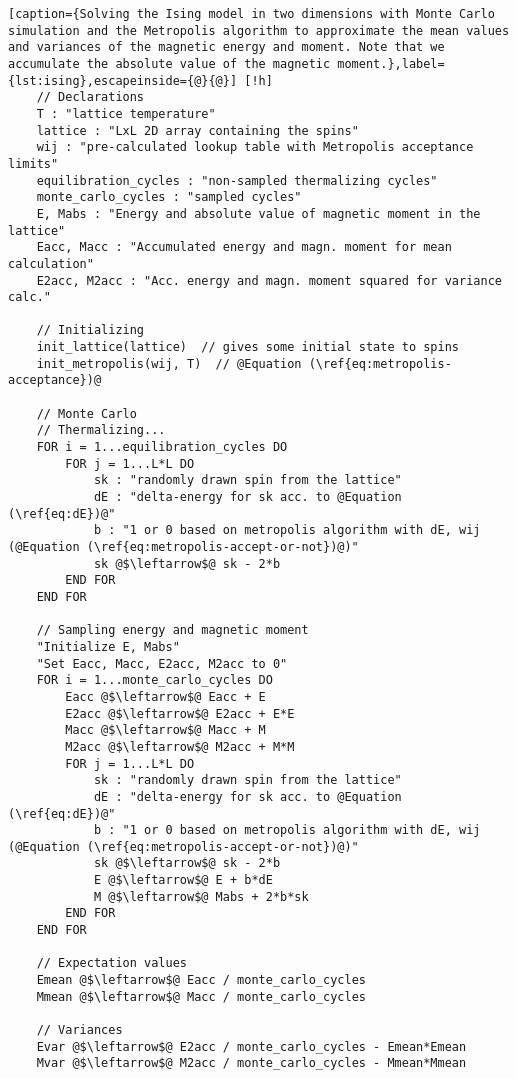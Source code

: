 \documentclass[]{article}
\begin{document}
\begin{lstlisting}[caption={Solving the Ising model in two dimensions with Monte Carlo simulation and the Metropolis algorithm to approximate the mean values and variances of the magnetic energy and moment. Note that we accumulate the absolute value of the magnetic moment.},label={lst:ising},escapeinside={@}{@}] [!h]
	// Declarations
	T : "lattice temperature"
	lattice : "LxL 2D array containing the spins"
	wij : "pre-calculated lookup table with Metropolis acceptance limits"
	equilibration_cycles : "non-sampled thermalizing cycles"
	monte_carlo_cycles : "sampled cycles"
	E, Mabs : "Energy and absolute value of magnetic moment in the lattice"
	Eacc, Macc : "Accumulated energy and magn. moment for mean calculation"
	E2acc, M2acc : "Acc. energy and magn. moment squared for variance calc."
	
	// Initializing
	init_lattice(lattice)  // gives some initial state to spins
	init_metropolis(wij, T)  // @Equation (\ref{eq:metropolis-acceptance})@
	
	// Monte Carlo
	// Thermalizing...
	FOR i = 1...equilibration_cycles DO
		FOR j = 1...L*L DO
			sk : "randomly drawn spin from the lattice"
			dE : "delta-energy for sk acc. to @Equation (\ref{eq:dE})@"
			b : "1 or 0 based on metropolis algorithm with dE, wij (@Equation (\ref{eq:metropolis-accept-or-not})@)"
			sk @$\leftarrow$@ sk - 2*b
		END FOR
	END FOR
	
	// Sampling energy and magnetic moment
	"Initialize E, Mabs"
	"Set Eacc, Macc, E2acc, M2acc to 0"
	FOR i = 1...monte_carlo_cycles DO
		Eacc @$\leftarrow$@ Eacc + E
		E2acc @$\leftarrow$@ E2acc + E*E
		Macc @$\leftarrow$@ Macc + M
		M2acc @$\leftarrow$@ M2acc + M*M		
		FOR j = 1...L*L DO
			sk : "randomly drawn spin from the lattice"
			dE : "delta-energy for sk acc. to @Equation (\ref{eq:dE})@"
			b : "1 or 0 based on metropolis algorithm with dE, wij (@Equation (\ref{eq:metropolis-accept-or-not})@)"
			sk @$\leftarrow$@ sk - 2*b
			E @$\leftarrow$@ E + b*dE
			M @$\leftarrow$@ Mabs + 2*b*sk
		END FOR
	END FOR	
	
	// Expectation values
	Emean @$\leftarrow$@ Eacc / monte_carlo_cycles
	Mmean @$\leftarrow$@ Macc / monte_carlo_cycles

	// Variances
	Evar @$\leftarrow$@ E2acc / monte_carlo_cycles - Emean*Emean
	Mvar @$\leftarrow$@ M2acc / monte_carlo_cycles - Mmean*Mmean	
\end{lstlisting}




\end{document}
